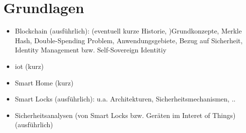 \section{Grundlagen}
\label{sec:sota}
    \begin{itemize}
        \item Blockchain (ausführlich): (eventuell kurze Historie, )Grundkonzepte, Merkle Hash, Double-Spending Problem, Anwendungsgebiete, Bezug auf Sicherheit, Identity Management bzw. Self-Sovereign Identitiy
        \item \gls{iot} (kurz)
        \item Smart Home (kurz)
        \item Smart Locks (ausführlich): u.a. Architekturen, Sicherheitsmechanismen, ..
        \item Sicherheitsanalysen (von Smart Locks bzw. Geräten im Interet of Things) (ausführlich)
    \end{itemize}
    
    

 